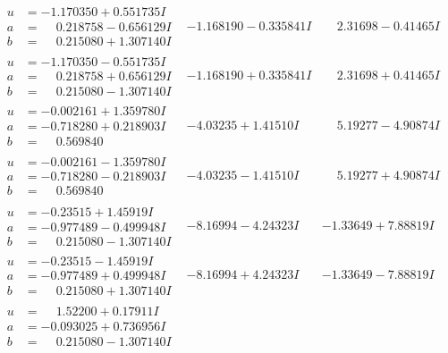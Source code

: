 \documentclass[1p]{elsarticle_modified}
\theoremstyle{definition}
\begin{document}
$$\begin{array}{c|c|c}
\begin{aligned}
u &= -1.170350 + 0.551735 I \\
a &= \phantom{-}0.218758 - 0.656129 I \\
b &= \phantom{-}0.215080 + 1.307140 I\end{aligned}
 & -1.168190 - 0.335841 I & \phantom{-}2.31698 - 0.41465 I \\ \hline\begin{aligned}
u &= -1.170350 - 0.551735 I \\
a &= \phantom{-}0.218758 + 0.656129 I \\
b &= \phantom{-}0.215080 - 1.307140 I\end{aligned}
 & -1.168190 + 0.335841 I & \phantom{-}2.31698 + 0.41465 I \\ \hline\begin{aligned}
u &= -0.002161 + 1.359780 I \\
a &= -0.718280 + 0.218903 I \\
b &= \phantom{-}0.569840\phantom{ +0.000000I}\end{aligned}
 & -4.03235 + 1.41510 I & \phantom{-}5.19277 - 4.90874 I \\ \hline\begin{aligned}
u &= -0.002161 - 1.359780 I \\
a &= -0.718280 - 0.218903 I \\
b &= \phantom{-}0.569840\phantom{ +0.000000I}\end{aligned}
 & -4.03235 - 1.41510 I & \phantom{-}5.19277 + 4.90874 I \\ \hline\begin{aligned}
u &= -0.23515 + 1.45919 I \\
a &= -0.977489 - 0.499948 I \\
b &= \phantom{-}0.215080 - 1.307140 I\end{aligned}
 & -8.16994 - 4.24323 I & -1.33649 + 7.88819 I \\ \hline\begin{aligned}
u &= -0.23515 - 1.45919 I \\
a &= -0.977489 + 0.499948 I \\
b &= \phantom{-}0.215080 + 1.307140 I\end{aligned}
 & -8.16994 + 4.24323 I & -1.33649 - 7.88819 I \\ \hline\begin{aligned}
u &= \phantom{-}1.52200 + 0.17911 I \\
a &= -0.093025 + 0.736956 I \\
b &= \phantom{-}0.215080 - 1.307140 I\end{aligned}

\end{array}$$
\end{document}
